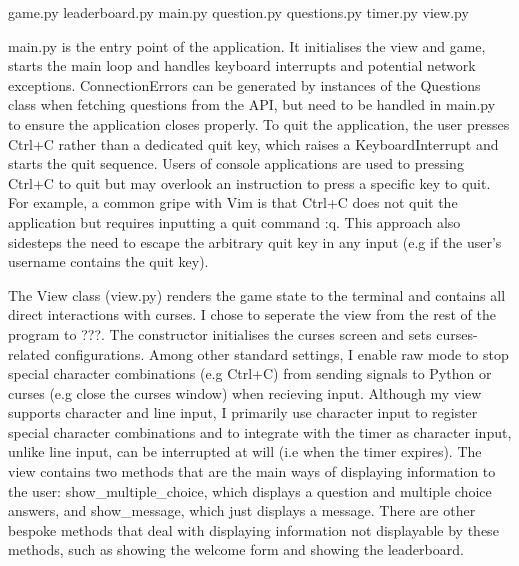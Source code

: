 \documentclass[12pt]{article}
\begin{document}
game.py
leaderboard.py
main.py
question.py
questions.py
timer.py
view.py

main.py is the entry point of the application. It initialises the view and game, starts the main loop and handles keyboard interrupts and potential network exceptions. ConnectionErrors can be generated by instances of the Questions class when fetching questions from the API, but need to be handled in main.py to ensure the application closes properly.
To quit the application, the user presses Ctrl+C rather than a dedicated quit key, which raises a KeyboardInterrupt and starts the quit sequence. Users of console applications are used to pressing Ctrl+C to quit but may overlook an instruction to press a specific key to quit. For example, a common gripe with Vim is that Ctrl+C does not quit the application but requires inputting a quit command :q. This approach also sidesteps the need to escape the arbitrary quit key in any input (e.g if the user's username contains the quit key). 

The View class (view.py) renders the game state to the terminal and contains all direct interactions with curses. I chose to seperate the view from the rest of the program to ???. 
The constructor initialises the curses screen and sets curses-related configurations. Among other standard settings, I enable raw mode to stop special character combinations (e.g Ctrl+C) from sending signals to Python or curses (e.g close the curses window) when recieving input. 
Although my view supports character and line input, I primarily use character input to register special character combinations and to integrate with the timer as character input, unlike line input, can be interrupted at will (i.e when the timer expires). 
The view contains two methods that are the main ways of displaying information to the user: show\_multiple\_choice, which displays a question and multiple choice answers, and show\_message, which just displays a message. There are other bespoke methods that deal with displaying information not displayable by these methods, such as showing the welcome form and showing the leaderboard.
\end{document}
